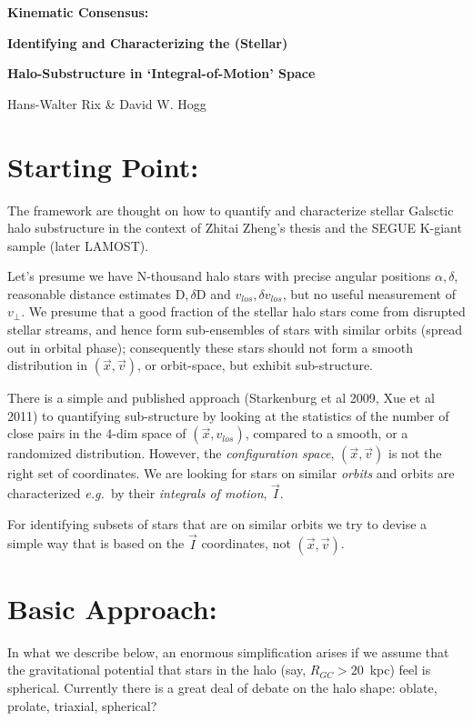 \documentclass[12pt,a4paper,twoside]{article}
\newcommand{\D}{{\mathrm D}}
\newcommand{\dD}{\delta{\mathrm D}}
\newcommand{\vlos}{v_{los}}
\newcommand{\dvlos}{\delta\vlos}
\newcommand{\vperp}{v_\perp}
\newcommand{\vx}{\vec{x}}
\newcommand{\vv}{\vec{v}}
\newcommand{\vI}{\vec{I}}
\newcommand{\eg}{{\it e.g.~}}
\begin{document}
\centerline{\Large\bf Kinematic Consensus:}
\centerline{\Large\bf Identifying and Characterizing the (Stellar)}
\centerline{\Large\bf Halo-Substructure in `Integral-of-Motion' Space}

\vspace{1em}
\centerline{\large Hans-Walter Rix \& David W. Hogg }
\vspace{0.5em}

\section{Starting Point:}

The framework are thought on how to quantify and characterize stellar Galsctic 
halo substructure in the context of Zhitai Zheng's thesis and the SEGUE K-giant sample (later LAMOST). 

Let's presume we have N-thousand halo stars with precise angular positions $\alpha,\delta$, 
reasonable distance estimates $\D,\dD$ and $\vlos,\dvlos$, but no useful measurement 
of $\vperp$. We presume that a good fraction of the stellar halo stars come from disrupted stellar streams, and hence form sub-ensembles of stars with similar orbits (spread out in orbital phase); consequently these stars should not form a smooth distribution in $(\vx,\vv)$, or orbit-space, but exhibit sub-structure. 

There is a simple and published approach (Starkenburg et al 2009, Xue et al 2011) to quantifying sub-structure by looking at the statistics of the number of close pairs in the 4-dim space of
$(\vx,\vlos)$, compared to a smooth, or a randomized distribution. However, the {\it configuration space}, $(\vx,\vv)$ is not the right set of coordinates. We are looking for stars on similar {\sl orbits} and orbits are characterized \eg by their {\sl integrals of motion}, $\vI$. 

For identifying subsets of stars that are on similar orbits we try to devise a simple way 
that is based on the $\vI$ coordinates, not $(\vx,\vv)$. 

\section{Basic Approach:}

In what we describe below, an enormous simplification arises if we assume that the gravitational potential that stars in the halo (say, $R_{GC}>20$~kpc) feel is spherical. Currently there is a great deal of debate on the halo shape: oblate, prolate, triaxial, spherical? 
\end{document}
